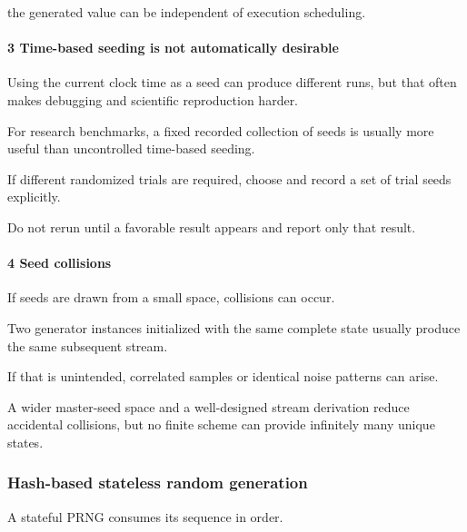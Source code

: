 the generated value can be independent of execution scheduling.

\paragraph{3 Time-based seeding is not automatically desirable}\label{02-foundations-ii-ch029-time-based-seeding-is-not-automatically-desirable}

\hypertarget{02-foundations-ii-ch029-time-based-seeding-is-not-automatically-desirable}{}

Using the current clock time as a seed can produce different runs, but that often makes debugging and scientific reproduction harder.

For research benchmarks, a fixed recorded collection of seeds is usually more useful than uncontrolled time-based seeding.

If different randomized trials are required, choose and record a set of trial seeds explicitly.

Do not rerun until a favorable result appears and report only that result.

\paragraph{4 Seed collisions}\label{02-foundations-ii-ch029-seed-collisions}

\hypertarget{02-foundations-ii-ch029-seed-collisions}{}

If seeds are drawn from a small space, collisions can occur.

Two generator instances initialized with the same complete state usually produce the same subsequent stream.

If that is unintended, correlated samples or identical noise patterns can arise.

A wider master-seed space and a well-designed stream derivation reduce accidental collisions, but no finite scheme can provide infinitely many unique states.

\subsubsection{Hash-based stateless random generation}\label{02-foundations-ii-ch029-hash-based-stateless-random-generation}

\hypertarget{02-foundations-ii-ch029-hash-based-stateless-random-generation}{}

A stateful PRNG consumes its sequence in order.

